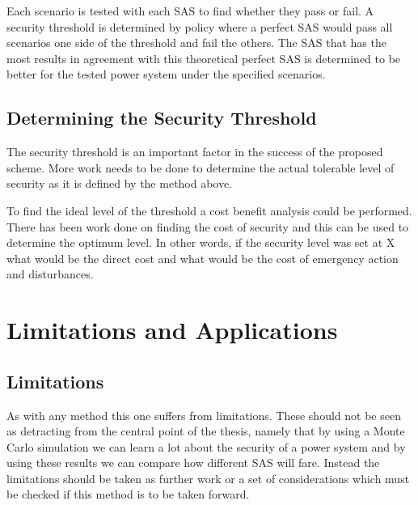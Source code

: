 \documentclass[a4paper,oneside,12pt]{report}
\begin{document}
Each scenario is tested with each SAS to find whether they pass or fail. A security threshold is determined by policy where a perfect SAS would pass all scenarios one side of the threshold and fail the others. The SAS that has the most results in agreement with this theoretical perfect SAS is determined to be better for the tested power system under the specified scenarios.

\subsection{Determining the Security Threshold}

The security threshold is an important factor in the success of the proposed scheme. More work needs to be done to determine the actual tolerable level of security as it is defined by the method above.

To find the ideal level of the threshold a cost benefit analysis could be performed. There has been work done on finding the cost of security \cite{Bell1999, Kirschen2003} and this can be used to determine the optimum level. In other words, if the security level was set at X what would be the direct cost and what would be the cost of emergency action and disturbances.

\section{Limitations and Applications}

\subsection{Limitations} \label{sec_limitations}

As with any method this one suffers from limitations. These should not be seen as detracting from the central point of the thesis, namely that by using a Monte Carlo simulation we can learn a lot about the security of a power system and by using these results we can compare how different SAS will fare. Instead the limitations should be taken as further work or a set of considerations which must be checked if this method is to be taken forward.
\end{document}
